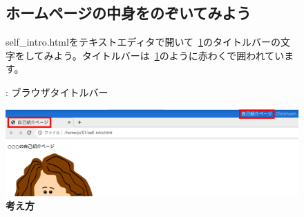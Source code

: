 \documentclass[a4paper,12pt]{jarticle}
\begin{document}
\clearpage
\begin{figure}[ht]
  \subsection{\theExercise ホームページの中身をのぞいてみよう}
  \addtocounter{Exercise}{-1}\label{E:HTML_1}
  self\_intro.htmlをテキストエディタで開いて~\ref{seq:refFigure31}のタイトルバーの文字をしてみよう。タイトルバーは~\ref{seq:refFigure31}のように赤わくで囲われています。


  \bigskip



  \centering
  \begin{minipage}{\textwidth}
    {\upshape
      {\theFigure\label{seq:refFigure31}}:
      ブラウザタイトルバー}
  \end{minipage}

  \centering
  \includegraphics[width=\textwidth]{textbook-img143.png}
  \flushleft
  \textbf{考え方}


\end{figure}
\end{document}
